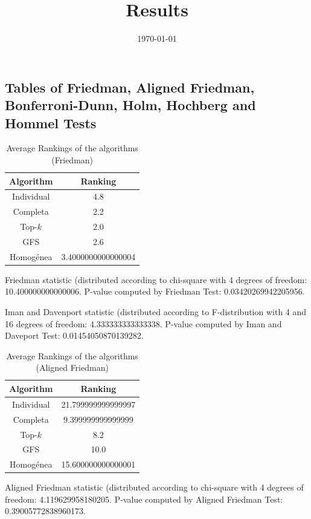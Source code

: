\documentclass[a4paper,10pt]{article}
\title{Results}
\author{}
\date{\today}
\begin{document}
\begin{landscape}
\oddsidemargin 0in \topmargin 0in\maketitle
\section{Tables of Friedman, Aligned Friedman, Bonferroni-Dunn, Holm, Hochberg and Hommel Tests}
\begin{table}[!htp]
\centering
\caption{Average Rankings of the algorithms (Friedman)
}\begin{tabular}{c|c}
Algorithm&Ranking\\
\hline
Individual&4.8\\
Completa&2.2\\
Top-$k$&2.0\\
GFS&2.6\\
Homogénea&3.4000000000000004\\
\end{tabular}
\end{table}


Friedman statistic (distributed according to chi-square with 4 degrees of freedom: 10.400000000000006. 
P-value computed by Friedman Test: 0.03420269942205956.\newline

Iman and Davenport statistic (distributed according to F-distribution with 4 and 16 degrees of freedom: 4.333333333333338. 
P-value computed by Iman and Daveport Test: 0.01454050870139282.\newline


\newpage

\begin{table}[!htp]
\centering
\caption{Average Rankings of the algorithms (Aligned Friedman)
}\begin{tabular}{c|c}
Algorithm&Ranking\\
\hline
Individual&21.799999999999997\\
Completa&9.399999999999999\\
Top-$k$&8.2\\
GFS&10.0\\
Homogénea&15.600000000000001\\
\end{tabular}
\end{table}


Aligned Friedman statistic (distributed according to chi-square with 4 degrees of freedom: 4.119629958180205. 
P-value computed by Aligned Friedman Test: 0.39005772838960173.\newline



\end{landscape}
\end{document}
